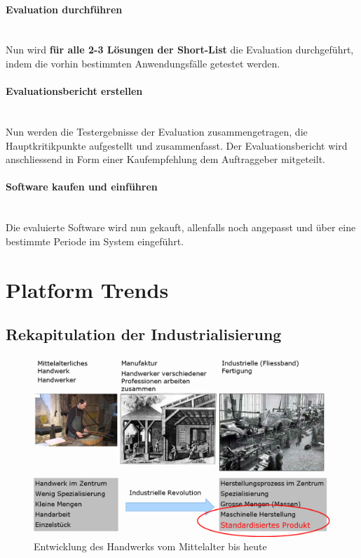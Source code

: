 \documentclass[a4paper, 11pt]{article}
\begin{document}
\paragraph{Evaluation durchführen}\mbox{}\\
Nun wird \textbf{für alle 2-3 Lösungen der Short-List} die Evaluation durchgeführt, indem die vorhin bestimmten Anwendungsfälle getestet werden.

\paragraph{Evaluationsbericht erstellen}\mbox{}\\
Nun werden die Testergebnisse der Evaluation zusammengetragen, die Hauptkritikpunkte aufgestellt und zusammenfasst. Der Evaluationsbericht wird anschliessend in Form einer Kaufempfehlung dem Auftraggeber mitgeteilt.

\paragraph{Software kaufen und einführen}\mbox{}\\
Die evaluierte Software wird nun gekauft, allenfalls noch angepasst und über eine bestimmte Periode im System eingeführt.

\newpage

\section{Platform Trends}
\subsection{Rekapitulation der Industrialisierung}
\begin{figure}[htb]
	\centering
	\includegraphics[keepaspectratio=true,height=20\baselineskip]{industrialisierung.PNG}
	\caption{Entwicklung des Handwerks vom Mittelalter bis heute}
	\label{fig:industrialisierung}
\end{figure}
\end{document}

